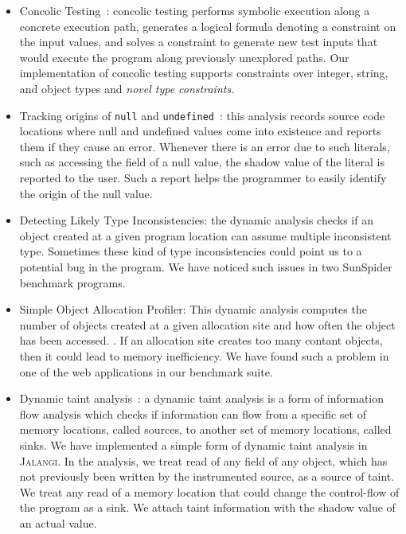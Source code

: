 \documentclass{sig-alternate}
\def\jalangi{\textsc{Jalangi}}
\begin{document}
\begin{itemize}
\item Concolic Testing~\cite{dart,cute}: concolic testing performs
  symbolic execution along a concrete execution path, generates a
  logical formula denoting a constraint on the input values, and
  solves a constraint to generate new test inputs that would execute
  the program along previously unexplored paths.  Our implementation
  of concolic testing supports constraints over integer, string, and
  object types and \emph{novel type constraints.}
\item Tracking origins of \texttt{null} and
  \texttt{undefined}~\cite{Bond:2007:TBA:1297027.1297057}: this
  analysis records source code locations where null and undefined
  values come into existence and reports them if they cause an error.
  Whenever there is an error due to such literals, such as accessing
  the field of a null value, the shadow value of the literal is
  reported to the user.  Such a report helps the programmer to easily
  identify the origin of the null value.
\item Detecting Likely Type Inconsistencies: the dynamic analysis
  checks if an object created at a given program location can assume
  multiple inconsistent type.
  Sometimes these kind of type inconsistencies could point us to a
  potential bug in the program.  We have noticed such issues in two
  SunSpider benchmark programs.
\item Simple Object Allocation Profiler: This dynamic analysis
  computes the number of objects created at a given allocation site
  and how often the object has been accessed.%
  .  If an allocation site creates too many contant objects, then it
  could lead to memory inefficiency.  We have found such a problem in
  one of the web applications in our benchmark suite.
\item Dynamic taint
  analysis~\cite{songndss05}: a
  dynamic taint analysis is a form of information flow analysis which
  checks if information can flow from a specific set of memory
  locations, called sources, to another set of memory locations,
  called sinks.  We have implemented a simple form of dynamic taint
  analysis in \jalangi{}.  In the analysis, we treat read of any field
  of any object, which has not previously been written by the
  instrumented source, as a source of taint.  We treat any read of a
  memory location that could change the control-flow of the program as
  a sink.  We attach taint information with the shadow value of an
  actual value.
\end{itemize}
\end{document}

